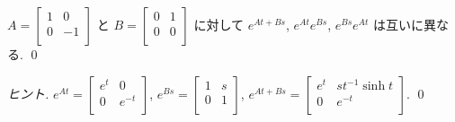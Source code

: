 \documentclass[12pt,twoside]{jarticle}
\begin{document}
\begin{question}
  \(
    A =
    \begin{bmatrix}
      1 & 0 \\
      0 & -1 \\
    \end{bmatrix}
  \) と %
  \(
    B =
    \begin{bmatrix}
      0 & 1 \\
      0 & 0 \\
    \end{bmatrix}
  \) に対して $e^{At+Bs}$, $e^{At} e^{Bs}$, $e^{Bs} e^{At}$ は互いに異なる.
  \qed
\end{question}

\begin{proof}[ヒント]
  \quad\(
    e^{At} =
    \begin{bmatrix}
      e^t & 0 \\
      0 & e^{-t} \\
    \end{bmatrix}
  \), \(
    e^{Bs} =
    \begin{bmatrix}
      1 & s \\
      0 & 1 \\
    \end{bmatrix}
  \), \(
    e^{At+Bs} =
    \begin{bmatrix}
      e^t & s t^{-1} \sinh t \\
      0 & e^{-t} \\
    \end{bmatrix}
  \).
  \qed
\end{proof}

\end{document}
